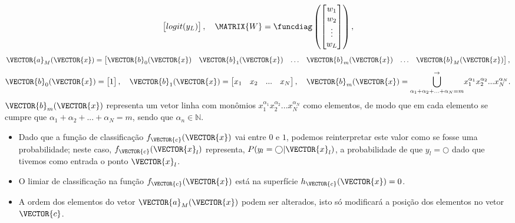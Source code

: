 \begin{theorem}
\begin{equation}
\begin{bmatrix}
logit(y_L) \\
\end{bmatrix},
\quad
\MATRIX{W}=\funcdiag \left(
\begin{bmatrix}
w_1  \\
w_2  \\
\vdots \\
w_L \\
\end{bmatrix} \right),
\end{equation}
\begin{equation}\label{eq:reglogrnr1poly:3}
\VECTOR{a}_M(\VECTOR{x})=
\begin{bmatrix}
\VECTOR{b}_0(\VECTOR{x}) &
\VECTOR{b}_1(\VECTOR{x}) &
\hdots &
\VECTOR{b}_m(\VECTOR{x}) &
\hdots &
\VECTOR{b}_M(\VECTOR{x}) 
\end{bmatrix},
\end{equation}
\begin{equation}\label{eq:reglogrnr1poly:4}
\VECTOR{b}_0(\VECTOR{x})=
\begin{bmatrix}
1 
\end{bmatrix},
\quad 
\VECTOR{b}_1(\VECTOR{x})=
\begin{bmatrix}
x_1 & x_2 & ... &  x_N
\end{bmatrix},
\quad 
\VECTOR{b}_m(\VECTOR{x})=
{\bigcup\limits_{\alpha_1+\alpha_2+...+\alpha_N=m}^{\rightarrow}}{x_1^{\alpha_1} x_2^{\alpha_2} ... x_N^{\alpha_N}} .
\end{equation}
$\VECTOR{b}_m(\VECTOR{x})$ representa um vetor linha com monômios $x_1^{\alpha_1} x_2^{\alpha_2} ... x_N^{\alpha_N}$
como elementos, de modo que em cada elemento se cumpre que $\alpha_1+\alpha_2+...+\alpha_N=m$,
sendo que $\alpha_n \in \mathbb{N}$.
\end{theorem}

\begin{tcbattention}
\begin{itemize}
\item Dado que a função de classificação $f_{\VECTOR{c}}(\VECTOR{x})$ vai entre $0$ e $1$,
podemos reinterpretar este valor como se fosse uma probabilidade;
neste caso, $f_{\VECTOR{c}}(\VECTOR{x}_l)$ representa, $P(y_l=\bigcirc|\VECTOR{x}_l)$, 
a probabilidade de que $y_l=\bigcirc$ dado que tivemos como entrada o ponto $\VECTOR{x}_l$.
\item O limiar de classificação na função $f_{\VECTOR{c}}(\VECTOR{x})$ está na superfície $h_{\VECTOR{c}}(\VECTOR{x})=0$.
\item A ordem dos elementos do vetor $\VECTOR{a}_M(\VECTOR{x})$ podem ser alterados,
isto só modificará a posição dos elementos no vetor $\VECTOR{c}$.
\end{itemize}
\end{tcbattention}


